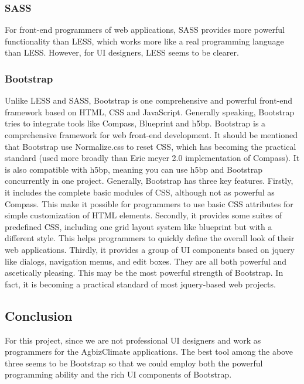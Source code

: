 \documentclass[letterpaper,10pt]{article}
\begin{document}
		\subsubsection{SASS}
        For front-end programmers of web applications, SASS provides more powerful functionality than LESS, which works more like a real programming language than LESS. However, for UI designers, LESS seems to be clearer.

		\subsubsection{Bootstrap}
    Unlike LESS and SASS, Bootstrap is one comprehensive and powerful front-end framework based on HTML, CSS and JavaScript. Generally speaking, Bootstrap tries to integrate tools like Compass, Blueprint and h5bp. Bootstrap is a comprehensive framework for web front-end development. It should be mentioned that Bootstrap use Normalize.css to reset CSS, which has becoming the practical standard (used more broadly than Eric meyer 2.0 implementation of Compass). It is also compatible with h5bp, meaning you can use h5bp and Bootstrap concurrently in one project. Generally, Bootstrap has three key features. Firstly, it includes the complete basic modules of CSS, although not as powerful as Compass. This make it possible for programmers to use basic CSS attributes for simple customization of HTML elements. Secondly, it provides some suites of predefined CSS, including one grid layout system like blueprint but with a different style. This helps programmers to quickly define the overall look of their web applications. Thirdly, it provides a group of UI components based on jquery like dialogs, navigation menus, and edit boxes. They are all both powerful and ascetically pleasing. This may be the most powerful strength of Bootstrap. In fact, it is becoming a practical standard of most jquery-based web projects.

	\subsection{Conclusion}
      For this project, since we are not professional UI designers and work as programmers for the AgbizClimate applications. The best tool among the above three seems to be Bootstrap so that we could employ both the powerful programming ability and the rich UI components of Bootstrap.
\end{document}
